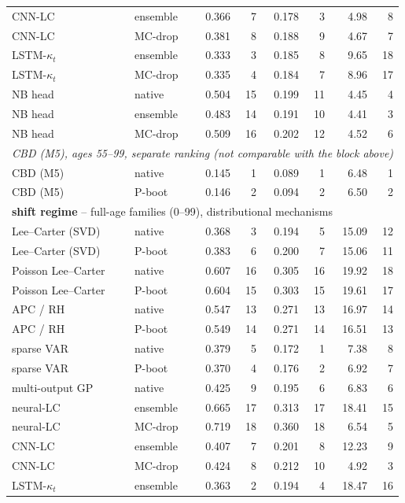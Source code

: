 {\begin{longtable}{@{}llrrrrrr@{}}
CNN-LC & ensemble & 0.366 & 7 & 0.178 & 3 & 4.98 & 8 \\
CNN-LC & MC-drop & 0.381 & 8 & 0.188 & 9 & 4.67 & 7 \\
LSTM-$\kappa_t$ & ensemble & 0.333 & 3 & 0.185 & 8 & 9.65 & 18 \\
LSTM-$\kappa_t$ & MC-drop & 0.335 & 4 & 0.184 & 7 & 8.96 & 17 \\
NB head & native & 0.504 & 15 & 0.199 & 11 & 4.45 & 4 \\
NB head & ensemble & 0.483 & 14 & 0.191 & 10 & 4.41 & 3 \\
NB head & MC-drop & 0.509 & 16 & 0.202 & 12 & 4.52 & 6 \\
\multicolumn{8}{l}{\emph{CBD (M5), ages 55--99, separate ranking (not comparable with the block above)}} \\
\midrule
CBD (M5) & native & 0.145 & 1 & 0.089 & 1 & 6.48 & 1 \\
CBD (M5) & P-boot & 0.146 & 2 & 0.094 & 2 & 6.50 & 2 \\
\multicolumn{8}{l}{\textbf{shift regime} -- full-age families (0--99), distributional mechanisms} \\
\midrule
Lee--Carter (SVD) & native & 0.368 & 3 & 0.194 & 5 & 15.09 & 12 \\
Lee--Carter (SVD) & P-boot & 0.383 & 6 & 0.200 & 7 & 15.06 & 11 \\
Poisson Lee--Carter & native & 0.607 & 16 & 0.305 & 16 & 19.92 & 18 \\
Poisson Lee--Carter & P-boot & 0.604 & 15 & 0.303 & 15 & 19.61 & 17 \\
APC / RH & native & 0.547 & 13 & 0.271 & 13 & 16.97 & 14 \\
APC / RH & P-boot & 0.549 & 14 & 0.271 & 14 & 16.51 & 13 \\
sparse VAR & native & 0.379 & 5 & 0.172 & 1 & 7.38 & 8 \\
sparse VAR & P-boot & 0.370 & 4 & 0.176 & 2 & 6.92 & 7 \\
multi-output GP & native & 0.425 & 9 & 0.195 & 6 & 6.83 & 6 \\
neural-LC & ensemble & 0.665 & 17 & 0.313 & 17 & 18.41 & 15 \\
neural-LC & MC-drop & 0.719 & 18 & 0.360 & 18 & 6.54 & 5 \\
CNN-LC & ensemble & 0.407 & 7 & 0.201 & 8 & 12.23 & 9 \\
CNN-LC & MC-drop & 0.424 & 8 & 0.212 & 10 & 4.92 & 3 \\
LSTM-$\kappa_t$ & ensemble & 0.363 & 2 & 0.194 & 4 & 18.47 & 16 \\

\end{longtable}}
